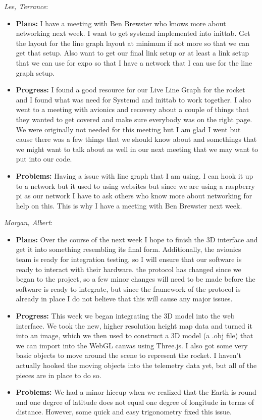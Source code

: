 \documentclass[10pt,draftclsnofoot,onecolumn]{IEEEtran}
\newcommand{\subsubsubsection}[1]{
	\hfill\break\textit{#1}:
}
\begin{document}
\subsubsubsection{Lee, Terrance}
\begin{itemize}
	\item \textbf{Plans: }
	I have a meeting with Ben Brewster who knows more about networking next week. I want to get systemd implemented into inittab. Get the layout for the line graph layout at minimum if not more so that we can get that setup. Also want to get our final link setup or at least a link setup that we can use for expo so that I have a network that I can use for the line graph setup.
	\item \textbf{Progress: }
	I found a good resource for our Live Line Graph for the rocket and I found what was need for Systemd and inittab to work together. I also went to a meeting with avionics and recovery about a couple of things that they wanted to get covered and make sure everybody was on the right page. We were originally not needed for this meeting but I am glad I went but cause there was a few things that we should know about and somethings that we might want to talk about as well in our next meeting that we may want to put into our code.
	\item \textbf{Problems: }
	Having a issue with line graph that I am using. I can hook it up to a network but it used to using websites but since we are using a raspberry pi as our network I have to ask others who know more about networking for help on this. This is why I have a meeting with Ben Brewster next week.
\end{itemize}


\subsubsubsection{Morgan, Albert}
\begin{itemize}
	\item \textbf{Plans: }
	Over the course of the next week I hope to finish the 3D interface and get it into something resembling its final form. Additionally, the avionics team is ready for integration testing, so I will ensure that our software is ready to interact with their hardware. the protocol has changed since we began to the project, so a few minor changes will need to be made before the software is ready to integrate, but since the framework of the protocol is already in place I do not believe that this will cause any major issues.
	\item \textbf{Progress: }
	This week we began integrating the 3D model into the web interface. We took the new, higher resolution height map data and turned it into an image, which we then used to construct a 3D model (a .obj file) that we can import into the WebGL canvas using Three.js. I also got some very basic objects to move around the scene to represent the rocket. I haven't actually hooked the moving objects into the telemetry data yet, but all of the pieces are in place to do so.
	\item \textbf{Problems: }
	We had a minor hiccup when we realized that the Earth is round and one degree of latitude does not equal one degree of longitude in terms of distance. However, some quick and easy trigonometry fixed this issue.
\end{itemize}
\end{document}
